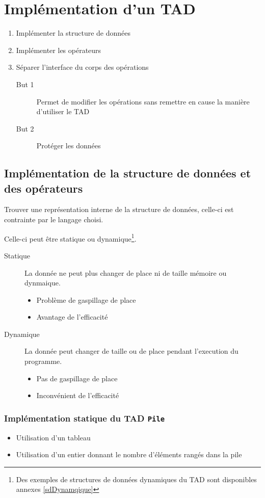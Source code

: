\section{Implémentation d'un TAD}
\begin{enumerate}
	\item Implémenter la structure de données
	\item Implémenter les opérateurs
	\item Séparer l'interface du corps des opérations
		\begin{description}
			\item[But 1] Permet de modifier les opérations sans remettre en cause la manière d'utiliser le TAD
			\item[But 2] Protéger les données
		\end{description}
\end{enumerate}

\subsection{Implémentation de la structure de données et des opérateurs}
Trouver une représentation interne de la structure de données, celle-ci est contrainte par le langage choisi.

Celle-ci peut être statique ou dynamique\footnote{Des exemples de structures de données dynamiques du TAD sont disponibles annexes \ref{sdDynamqique}}. 
\begin{description}
	\item[Statique] La donnée ne peut plus changer de place ni de taille mémoire ou dynmaique.
		\begin{itemize}
			\item Problème de gaspillage de place
			\item Avantage de l'efficacité
		\end{itemize}
	\item[Dynamique] La donnée peut changer de taille ou de place pendant l'execution du programme.
		\begin{itemize}
			\item Pas de gaspillage de place
			\item Inconvénient de l'efficacité
		\end{itemize}
\end{description}

\subsubsection{Implémentation statique du TAD \texttt{Pile}}
\begin{itemize}
	\item Utilisation d'un tableau
	\item Utilisation d'un entier donnant le nombre d'éléments rangés dans la pile
\end{itemize}

